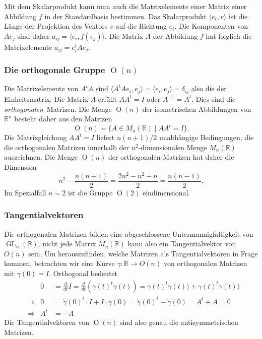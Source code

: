 Mit dem Skalarprodukt kann man auch die Matrixelemente einer Matrix
einer Abbildung $f$ in der Standardbasis bestimmen.
Das Skalarprodukt $\langle e_i, v\rangle$ ist die Länge der Projektion
des Vektors $v$ auf die Richtung $e_i$.
Die Komponenten von $Ae_j$ sind daher $a_{i\!j}=\langle e_i,f(e_j)\rangle$.
Die Matrix $A$ der Abbildung $f$ hat folglich die Matrixelemente
$a_{i\!j}=e_i^tAe_j$.

\subsubsection{Die orthogonale Gruppe $\operatorname{O}(n)$}
Die Matrixelemente von $A^tA$ sind
$\langle A^tAe_i, e_j\rangle =\langle e_i,e_j\rangle = \delta_{i\!j}$
also die der Einheitsmatrix.
Die Matrix $A$ erfüllt $AA^t=I$ oder $A^{-1}=A^t$.
Dies sind die {\em orthogonalen} Matrizen.
%
Die Menge $\operatorname{O}(n)$ der isometrischen Abbildungen
%
von $\mathbb{R}^n$ besteht
daher aus den Matrizen
\[
\operatorname{O}(n)
=
\{ A\in M_n(\mathbb{R})\;|\; AA^t=I\}.
\]
Die Matrixgleichung $AA^t=I$ liefert $n(n+1)/2$ unabhängige Bedingungen,
die die orthogonalen Matrizen innerhalb der $n^2$-dimensionalen
Menge $M_n(\mathbb{R})$ auszeichnen.
Die Menge $\operatorname{O}(n)$ der orthogonalen Matrizen hat daher
die Dimension
\[
n^2 - \frac{n(n+1)}{2}
=
\frac{2n^2-n^2-n}{2}
=
\frac{n(n-1)}2.
\]
Im Spezialfall $n=2$ ist die Gruppe $\operatorname{O}(2)$ eindimensional.

\subsubsection{Tangentialvektoren}
Die orthogonalen Matrizen bilden eine abgeschlossene Untermannigfaltigkeit
von $\operatorname{GL}_n(\mathbb{R})$, nicht jede Matrix $M_n(\mathbb{R})$ 
kann also ein Tangentialvektor von $O(n)$ sein.
Um herauszufinden, welche Matrizen als Tangentialvektoren in Frage
kommen, betrachten wir eine Kurve $\gamma\colon\mathbb{R}\to O(n)$
von orthogonalen Matrizen mit $\gamma(0)=I$.
Orthogonal bedeutet 
\[
\begin{aligned}
&&
0
&=
\frac{d}{dt}I
=
\frac{d}{dt}
(\gamma(t)^t\gamma(t))
=
\dot{\gamma}(t)^t\gamma(t))
+
\gamma(t)^t\dot{\gamma}(t))
\\
&\Rightarrow&
0
&=
\dot{\gamma}(0)^t \cdot I + I\cdot \dot{\gamma(0)}
=
\dot{\gamma}(0)^t + \dot{\gamma}(0)
=
A^t+A=0
\\
&\Rightarrow&
A^t&=-A
\end{aligned}
\]
Die Tangentialvektoren von $\operatorname{O}(n)$ sind also genau
die antisymmetrischen Matrizen.
%

